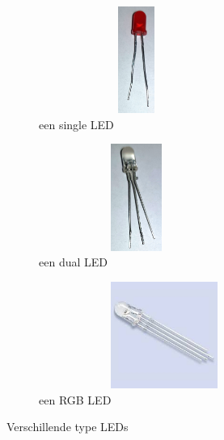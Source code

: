 \begin{figure}[h!]
	\centering
	\begin{subfigure}[b]{0.3\textwidth}
		\centering
		\includegraphics[width=0.7\textwidth,height=3.5cm]{figuren/singleled}
		\caption{een single LED}
		\label{fig:singleLed}
	\end{subfigure}
	\hfill
	\begin{subfigure}[b]{0.3\textwidth}
		\centering
		\includegraphics[width=0.7\textwidth,height=3.5cm]{figuren/dualled}
		\caption{een dual LED}
		\label{fig:dualLed}
	\end{subfigure}
	\hfill
	\begin{subfigure}[b]{0.3\textwidth}
		\centering
		\includegraphics[width=0.9\textwidth,height=3.5cm]{figuren/rgbled}
		\caption{een RGB LED}
		\label{fig:rgbLed}
	\end{subfigure}
	\caption{Verschillende type LEDs}
	\label{fig:LEDs}
\end{figure}

